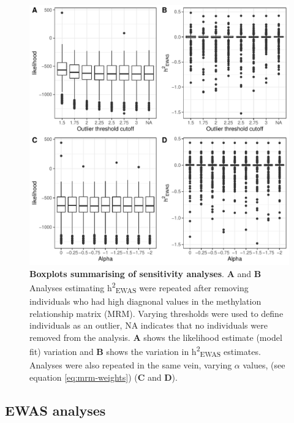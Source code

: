 \documentclass[11pt,oneside]{bristolthesis}
\begin{document}
\begin{figure}

{\centering \includegraphics[width=1\linewidth]{figure/05-h2ewas/sens_boxplots} 

}

\caption[Boxplots summarising of sensitivity analyses]{\textbf{Boxplots summarising of sensitivity analyses}. \textbf{A} and \textbf{B} Analyses estimating h\textsuperscript{2}\textsubscript{EWAS} were repeated after removing individuals who had high diagnonal values in the methylation relationship matrix (MRM). Varying thresholds were used to define individuals as an outlier, NA indicates that no individuals were removed from the analysis. \textbf{A} shows the likelihood estimate (model fit) variation and \textbf{B} shows the variation in h\textsuperscript{2}\textsubscript{EWAS} estimates. Analyses were also repeated in the same vein, varying \(\alpha\) values, (see equation \eqref{eq:mrm-weights}) (\textbf{C} and \textbf{D}).}\label{fig:h2ewas-sens}
\end{figure}
\hypertarget{results-ewas-analyses-05}{%
\subsection{EWAS analyses}\label{results-ewas-analyses-05}}
\end{document}
